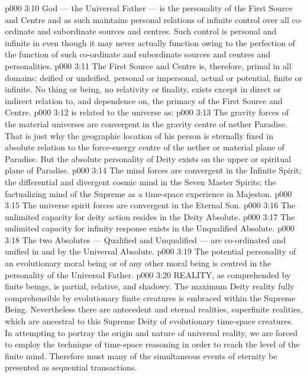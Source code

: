 \vs p000 3:10 God --- the Universal Father --- is the personality of the First Source and Centre and as such maintains personal relations of infinite control over all co\hyp{}ordinate and subordinate sources and centres. Such control is personal and infinite in  even though it may never actually function owing to the perfection of the function of such co\hyp{}ordinate and subordinate sources and centres and personalities.
\vs p000 3:11 The First Source and Centre is, therefore, primal in all domains: deified or undeified, personal or impersonal, actual or potential, finite or infinite. No thing or being, no relativity or finality, exists except in direct or indirect relation to, and dependence on, the primacy of the First Source and Centre.
\vs p000 3:12 \pc {} is related to the universe as:
\vs p000 3:13 \bibnobreakspace The gravity forces of the material universes are convergent in the gravity centre of nether Paradise. That is just why the geographic location of his person is eternally fixed in absolute relation to the force\hyp{}energy centre of the nether or material plane of Paradise. But the absolute personality of Deity exists on the upper or spiritual plane of Paradise.
\vs p000 3:14 \bibnobreakspace The mind forces are convergent in the Infinite Spirit; the differential and divergent cosmic mind in the Seven Master Spirits; the factualizing mind of the Supreme as a time\hyp{}space experience in Majeston.
\vs p000 3:15 \bibnobreakspace The universe spirit forces are convergent in the Eternal Son.
\vs p000 3:16 \bibnobreakspace The unlimited capacity for deity action resides in the Deity Absolute.
\vs p000 3:17 \bibnobreakspace The unlimited capacity for infinity response exists in the Unqualified Absolute.
\vs p000 3:18 \bibnobreakspace The two Absolutes --- Qualified and Unqualified --- are co\hyp{}ordinated and unified in and by the Universal Absolute.
\vs p000 3:19 \bibnobreakspace The potential personality of an evolutionary moral being or of any other moral being is centred in the personality of the Universal Father.
\vs p000 3:20 \pc REALITY, as comprehended by finite beings, is partial, relative, and shadowy. The maximum Deity reality fully comprehensible by evolutionary finite creatures is embraced within the Supreme Being. Nevertheless there are antecedent and eternal realities, superfinite realities, which are ancestral to this Supreme Deity of evolutionary time\hyp{}space creatures. In attempting to portray the origin and nature of universal reality, we are forced to employ the technique of time\hyp{}space reasoning in order to reach the level of the finite mind. Therefore must many of the simultaneous events of eternity be presented as sequential transactions.
